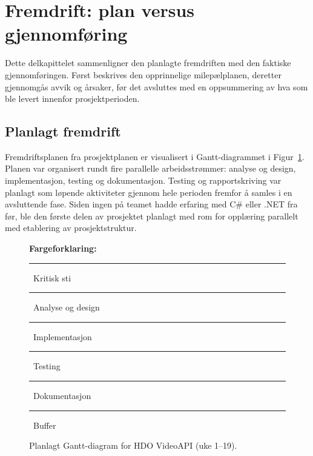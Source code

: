 
\section{Fremdrift: plan versus gjennomføring}
\label{sec:fremdrift}
Dette delkapittelet sammenligner den planlagte fremdriften med den faktiske gjennomføringen. Først beskrives den opprinnelige milepælplanen, deretter gjennomgås avvik og årsaker, før det avsluttes med en oppsummering
av hva som ble levert innenfor prosjektperioden.

\subsection{Planlagt fremdrift}
Fremdriftsplanen fra prosjektplanen er visualisert i Gantt-diagrammet i Figur~\ref{fig:gantt}.
Planen var organisert rundt fire parallelle arbeids\-strøm\-mer: analyse og design,
implementasjon, testing og dokumentasjon. Testing og rapport\-skriving var planlagt
som løpende aktiviteter gjennom hele perioden fremfor å samles i en avsluttende fase.
Siden ingen på teamet hadde erfaring med C\# eller .NET fra før, ble den første delen
av prosjektet planlagt med rom for opplæring parallelt med etablering av prosjekt\-struktur.
\clearpage
\begin{figure}[p]
\centering


\vspace{0.2em}
{\tiny
\textbf{Fargeforklaring:}\;
\textcolor{red!40}{\rule{0.45cm}{0.13cm}}~Kritisk sti \;
\textcolor{blue!30}{\rule{0.45cm}{0.13cm}}~Analyse og design \;
\textcolor{green!30}{\rule{0.45cm}{0.13cm}}~Implementasjon \;
\textcolor{orange!30}{\rule{0.45cm}{0.13cm}}~Testing \;
\textcolor{purple!30}{\rule{0.45cm}{0.13cm}}~Dokumentasjon \;
\textcolor{yellow!30}{\rule{0.45cm}{0.13cm}}~Buffer
}

\caption{Planlagt Gantt-diagram for HDO VideoAPI (uke 1--19).}
\label{fig:gantt}
\end{figure}
\clearpage

